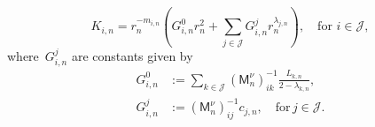 \documentclass[preprint,10pt,times]{elsarticle}
\numberwithin{equation}{section}
\renewcommand{\u}[1]{\boldsymbol{#1}}
\newcommand{\usf}[1]{\u{\mathsf #1}}
\newcommand{\pr}[1]{\left( #1 \right)}
\renewcommand{\>}{$\Rightarrow$}
\begin{document}
\begin{equation}
K_{i,n} = r_n^{-m_{i,n}} \left( G^0_{i,n} r^2_n + \sum_{j \in \mathcal{J}} G^j_{i,n} r^{\lambda_{j,n}}_n \right) , \quad \text{for~$i \in \mathcal{J}$},
\label{eq:appenKn}
\end{equation}
where~$G^j_{i,n}$ are constants given by
\begin{subequations}
\begin{align}
	G^0_{i,n}& := \sum_{k \in \mathcal{J}} \pr{\usf{M}_n^{\nu}}^{-1}_{ik} \frac{L_{k,n}}{2 - \lambda_{k,n}}, \\
	G^j_{i,n}& := \pr{\usf{M}_n^{\nu}}^{-1}_{ij} c_{j,n}, \quad \text{for}\, j\in \mathcal{J} .
\end{align}
\label{eq:Gjin}
\end{subequations}

\newpage


\end{document}
